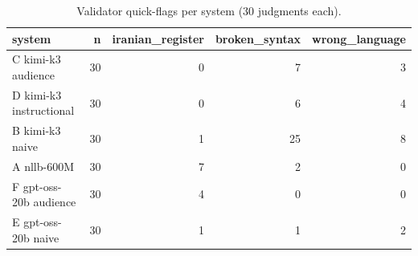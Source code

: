 \begin{table}[t]
\centering
\small
\begin{tabular}{lrrrr}
\toprule
system & n & iranian_register & broken_syntax & wrong_language \\
\midrule
C kimi-k3 audience & 30 & 0 & 7 & 3 \\
D kimi-k3 instructional & 30 & 0 & 6 & 4 \\
B kimi-k3 naive & 30 & 1 & 25 & 8 \\
A nllb-600M & 30 & 7 & 2 & 0 \\
F gpt-oss-20b audience & 30 & 4 & 0 & 0 \\
E gpt-oss-20b naive & 30 & 1 & 1 & 2 \\
\bottomrule
\end{tabular}
\caption{Validator quick-flags per system (30 judgments each).}
\label{tab:flags}
\end{table}
